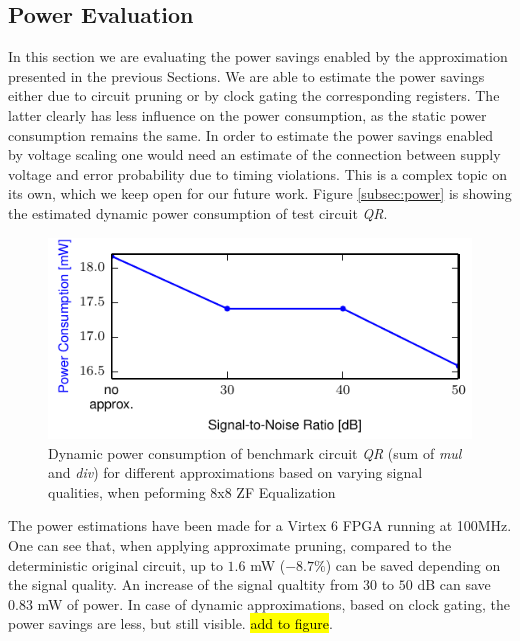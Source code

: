 \documentclass[conference]{IEEEtran}
\begin{document}
\subsection{Power Evaluation}
In this section we are evaluating the power savings enabled by the approximation presented in the previous Sections. We are able to estimate the power savings either due to circuit pruning or by clock gating the corresponding registers. The latter clearly has less influence on the power consumption, as the static power consumption remains the same. In order to estimate the power savings enabled by voltage scaling one would need an estimate of the connection between supply voltage and error probability due to timing violations. This is a complex topic on its own, which we keep open for our future work. Figure \ref{subsec:power} is showing the estimated dynamic power consumption of test circuit \emph{QR}. 
\label{subsec:power}
\begin{figure}[htb]
  \centering
  \includegraphics[width=.5\textwidth]{figs/power_qr}
  \caption{Dynamic power consumption of benchmark circuit \emph{QR} (sum of \emph{mul} and \emph{div}) for different approximations based on varying signal qualities, when peforming 8x8 ZF Equalization}
  \label{fig:power_qr}
\end{figure}
The power estimations have been made for a Virtex 6 FPGA running at 100MHz. One can see that, when applying approximate pruning, compared to the deterministic original circuit, up to $1.6$ mW ($-8.7\%$) can be saved depending on the signal quality. An increase of the signal qualtity from $30$ to $50$ dB can save $0.83$ mW of power. In case of dynamic approximations, based on clock gating, the power savings are less, but still visible. \hl{add to figure}.
\end{document}

